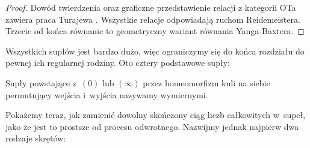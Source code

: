 \begin{proof}
    Dowód twierdzenia oraz graficzne przedstawienie relacji z kategorii OTa zawiera praca Turajewa \cite{turaev90}.
    Wszystkie relacje odpowiadają ruchom Reidemeistera.
%
    Trzecie od końca równanie to geometryczny wariant równania Yanga-Baxtera.
%
\end{proof}

Wszystkich supłów jest bardzo dużo, więc ograniczymy się do końca rozdziału do pewnej ich regularnej rodziny.
Oto cztery podstawowe supły:


\begin{definition}
    Supły powstające z~$(0)$ lub $(\infty)$ przez homeomorfizm kuli na siebie permutujący wejścia i~wyjścia nazywamy wymiernymi.
\end{definition}

Pokażemy teraz, jak zamienić dowolny skończony ciąg liczb całkowitych w~supeł, jako że jest to prostsze od procesu odwrotnego.
Nazwijmy jednak najpierw dwa rodzaje skrętów:
\begin{comment}
\[
    \begin{tikzpicture}[baseline=-0.65ex, scale=0.1]
    \useasboundingbox (-10, -10) rectangle (10, 5);
    \begin{knot}[clip width=5, end tolerance=1pt, flip crossing/.list={2}]
        \strand[semithick] (-10, -5) [out=right, in=left] to (0, 5) to (10, -5);
        \strand[semithick] (-10, 5) [out=right, in=left] to (0, -5);
        \strand[semithick] (0, -5) [out=right, in=left] to (10, 5);
        \node at (0, -9) {prawy skręt};
    \end{knot}
    \end{tikzpicture}
    \quad\quad\quad
    \begin{tikzpicture}[baseline=-0.65ex, scale=0.1]
    \useasboundingbox (-10, -10) rectangle (10, 5);
    \begin{knot}[clip width=5, end tolerance=1pt, flip crossing/.list={1}]
        \strand[semithick] (-10, -5) [out=right, in=left] to (0, 5) to (10, -5);
        \strand[semithick] (-10, 5) [out=right, in=left] to (0, -5);
        \strand[semithick] (0, -5) [out=right, in=left] to (10, 5);
        \node at (0, -9) {lewy skręt};
    \end{knot}
    \end{tikzpicture}
\]
\end{comment}

